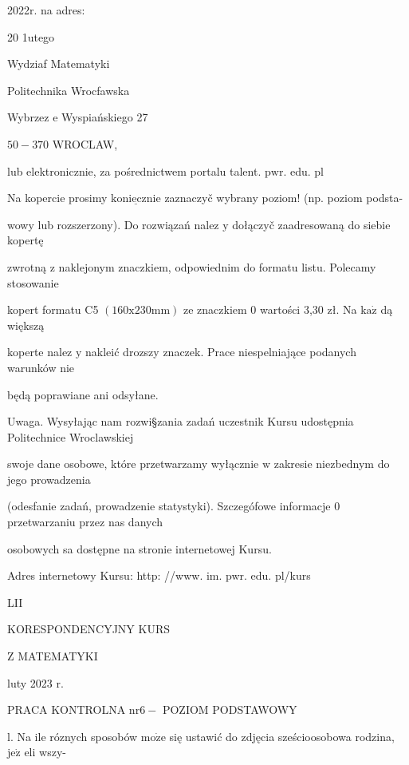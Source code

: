 \documentclass[a4paper,12pt]{article}
\begin{document}
2022r. na adres:

20 1utego

Wydziaf Matematyki

Politechnika Wrocfawska

Wybrzez $\mathrm{e}$ Wyspiańskiego 27

$50-370$ WROCLAW,

lub elektronicznie, za pośrednictwem portalu talent. $\mathrm{p}\mathrm{w}\mathrm{r}$. edu. pl

Na kopercie prosimy $\underline{\mathrm{k}\mathrm{o}\mathrm{n}\mathrm{i}\mathrm{e}\mathrm{c}\mathrm{z}\mathrm{n}\mathrm{i}\mathrm{e}}$ zaznaczyč wybrany poziom! (np. poziom podsta-

wowy lub rozszerzony). Do rozwiązań nalez $\mathrm{y}$ dołączyč zaadresowaną do siebie kopertę

zwrotną $\mathrm{z}$ naklejonym znaczkiem, odpowiednim do formatu listu. Polecamy stosowanie

kopert formatu C5 $(160\mathrm{x}230\mathrm{m}\mathrm{m})$ ze znaczkiem $0$ wartości 3,30 zł. Na $\mathrm{k}\mathrm{a}\dot{\mathrm{z}}$ dą większą

koperte nalez $\mathrm{y}$ nakleić drozszy znaczek. Prace niespelniające podanych warunków nie

będą poprawiane ani odsyłane.

Uwaga. Wysyłając nam rozwi\S zania zadań uczestnik Kursu udostępnia Politechnice Wroclawskiej

swoje dane osobowe, które przetwarzamy wyłącznie $\mathrm{w}$ zakresie niezbednym do jego prowadzenia

(odesfanie zadań, prowadzenie statystyki). Szczegófowe informacje $0$ przetwarzaniu przez nas danych

osobowych sa dostępne na stronie internetowej Kursu.

Adres internetowy Kursu: http: //www. im. pwr. edu. pl/kurs







LII

KORESPONDENCYJNY KURS

Z MATEMATYKI

luty 2023 r.

PRACA KONTROLNA $\mathrm{n}\mathrm{r} 6-$ POZIOM PODSTAWOWY

l. Na ile róznych sposobów $\mathrm{m}\mathrm{o}\dot{\mathrm{z}}\mathrm{e}$ się ustawić do zdjęcia sześcioosobowa rodzina, $\mathrm{j}\mathrm{e}\dot{\mathrm{z}}$ eli wszy-
\end{document}
